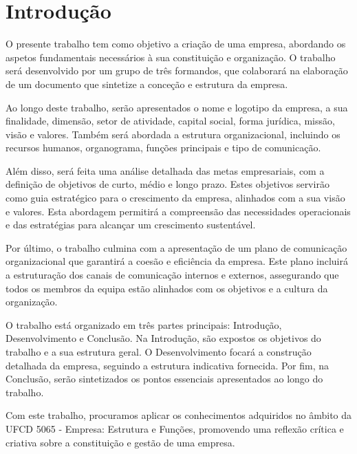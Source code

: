 \section{Introdução} \label{section: Introducao}
\par \vspace{8pt}
O presente trabalho tem como objetivo a criação de uma empresa, abordando os aspetos fundamentais necessários à sua constituição e organização. O trabalho será desenvolvido por um grupo de três formandos, que colaborará na elaboração de um documento que sintetize a conceção e estrutura da empresa.
\par \vspace{10pt}
Ao longo deste trabalho, serão apresentados o nome e logotipo da empresa, a sua finalidade, dimensão, setor de atividade, capital social, forma jurídica, missão, visão e valores. Também será abordada a estrutura organizacional, incluindo os recursos humanos, organograma, funções principais e tipo de comunicação.
\par \vspace{10pt}
Além disso, será feita uma análise detalhada das metas empresariais, com a definição de objetivos de curto, médio e longo prazo. Estes objetivos servirão como guia estratégico para o crescimento da empresa, alinhados com a sua visão e valores. Esta abordagem permitirá a compreensão das necessidades operacionais e das estratégias para alcançar um crescimento sustentável.
\par \vspace{10pt}
Por último, o trabalho culmina com a apresentação de um plano de comunicação organizacional que garantirá a coesão e eficiência da empresa. Este plano incluirá a estruturação dos canais de comunicação internos e externos, assegurando que todos os membros da equipa estão alinhados com os objetivos e a cultura da organização.
\par \vspace{10pt}
O trabalho está organizado em três partes principais: Introdução, Desenvolvimento e Conclusão. Na Introdução, são expostos os objetivos do trabalho e a sua estrutura geral. O Desenvolvimento focará a construção detalhada da empresa, seguindo a estrutura indicativa fornecida. Por fim, na Conclusão, serão sintetizados os pontos essenciais apresentados ao longo do trabalho.
\par \vspace{10pt}
Com este trabalho, procuramos aplicar os conhecimentos adquiridos no âmbito da UFCD 5065 - Empresa: Estrutura e Funções, promovendo uma reflexão crítica e criativa sobre a constituição e gestão de uma empresa.